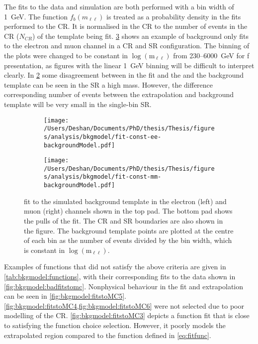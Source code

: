 The fits to the data and simulation are both performed with a bin width of \SI{1}{\giga\electronvolt}. The function $f_b(m_{\ell\ell})$ is treated as a probability density in the fits performed to the CR. It is normalised in the CR to the number of events in the CR ($N_{CR}$) of the template being fit. \cref{fig:bkgmodel:fitstoMC} shows an example of background only fits to the electron and muon channel in a CR and SR configuration. The binning of the plots were changed to be constant in $\log{(\text{m}_{\ell\ell})}$ from 230--\SI{6000}{\giga\electronvolt} for f presentation, as figures with the linear \SI{1}{\giga\electronvolt} binning will be difficult to interpret clearly. In \cref{fig:fitstoMC2} some disagreement between in the fit and the and the background template can be seen in the SR a high mass. However, the difference corresponding number of events between the extrapolation and background template will be very small in the single-bin SR.

\begin{figure}[h!]
    \centering
    \begin{subfigure}[b]{0.49\textwidth}
        \centering
        \texttt{[image: /Users/Deshan/Documents/PhD/thesis/Thesis/figures/analysis/bkgmodel/fit-const-ee-backgroundModel.pdf]}
        \label{fig:fitstoMC1}
    \end{subfigure}
    \begin{subfigure}[b]{0.49\textwidth}
        \centering
        \texttt{[image: /Users/Deshan/Documents/PhD/thesis/Thesis/figures/analysis/bkgmodel/fit-const-mm-backgroundModel.pdf]}
        \label{fig:fitstoMC2}
    \end{subfigure}
    \caption[Fits to the simulated background template in the electron and muon channels]{fit to the simulated background template in the electron (left) and muon (right) channels shown in the top pad. The bottom pad shows the pulls of the fit. The CR and SR boundaries are also shown in the figure. The background template points are plotted at the centre of each bin as the number of events divided by the bin width, which is constant in $\log{(\text{m}_{\ell\ell})}$.}
    \label{fig:bkgmodel:fitstoMC}
\end{figure}

Examples of functions that did not satisfy the above criteria are given in \cref{tab:bkgmodel:functions}, with their corresponding fits to the data shown in \cref{fig:bkgmodel:badfitstomc}. Nonphysical behaviour in the fit and  extrapolation can be seen in \cref{fig:bkgmodel:fitstoMC5}. \cref{fig:bkgmodel:fitstoMC4,fig:bkgmodel:fitstoMC6} were not selected due to poor modelling of the CR. \cref{fig:bkgmodel:fitstoMC3} depicts a function fit that is close to satisfying the function choice selection. However, it poorly models the extrapolated region compared to the function defined in \cref{eq:fitfunc}.

